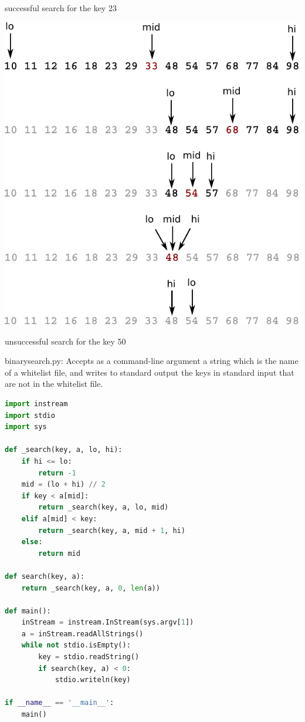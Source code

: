 \documentclass[8pt,a4paper,compress,handout]{beamer}
\begin{document}
\begin{frame}[fragile]
\begin{minipage}{150pt}
\begin{center}
\tiny successful search for the key 23
\end{center}
\end{minipage}
\begin{minipage}{150pt}%
\hfill
\begin{center}
\includegraphics[scale=0.4]{./figures/bs2.pdf}

\smallskip

\tiny unsuccessful search for the key 50
\end{center}
\end{minipage}
\end{frame}

\begin{frame}[fragile]
\begin{framed}
\tiny binarysearch.py: Accepts as a command-line argument a string which is the name of a whitelist file, and writes to standard output the keys in standard input that are not in the whitelist file.
\end{framed}

\begin{lstlisting}[language=Python]
import instream
import stdio
import sys

def _search(key, a, lo, hi):
    if hi <= lo:
        return -1
    mid = (lo + hi) // 2
    if key < a[mid]:
        return _search(key, a, lo, mid)
    elif a[mid] < key:
        return _search(key, a, mid + 1, hi)
    else:
        return mid

def search(key, a):
    return _search(key, a, 0, len(a))

def main():
    inStream = instream.InStream(sys.argv[1])
    a = inStream.readAllStrings()
    while not stdio.isEmpty():
        key = stdio.readString()
        if search(key, a) < 0:
            stdio.writeln(key)

if __name__ == '__main__':
    main()
\end{lstlisting}
\end{frame}
\end{document}
